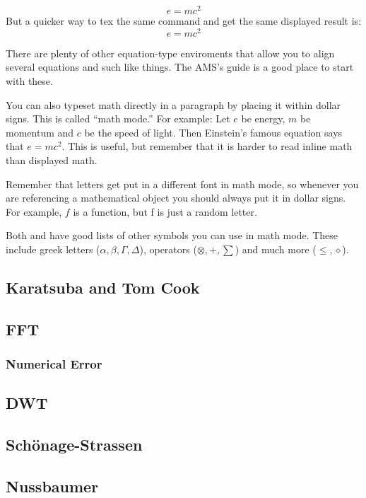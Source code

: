 \documentclass[psamsfonts]{amsart}
\theoremstyle{definition}
\theoremstyle{remark}
\numberwithin{equation}{section}
\begin{document}
\begin{equation*}
e=mc^2
\end{equation*}
But a quicker way to tex the same command and get the same displayed result is:
\[  e=mc^2 \]

There are plenty of other equation-type enviroments that allow you to
align several equations and such like things. The AMS's guide \cite{amsshort} is a
good place to start with these.

You can also typeset math directly in a paragraph by placing it within
dollar signs.  This is called ``math mode.''  For example: Let $e$
be energy, $m$ be momentum and $c$ be the speed of light.  Then
Einstein's famous equation says that $e=mc^2$.  This is useful, but
remember that it is harder to read inline math than displayed math. 

Remember that letters get put in a different font in math mode, so
whenever you are referencing a mathematical object you should always
put it in dollar signs.  For example, $f$ is a function, but f is just
a random letter.

Both \cite{notsoshort} and \cite{amsshort} have good lists of other symbols you can use in math mode.
These include greek letters ($\alpha, \beta, \Gamma, \Delta$),
operators ($\otimes, +, \sum$) and much more ($\leq, \diamond$).

\subsection{Karatsuba and Tom Cook}

\subsection{FFT}

\subsubsection{Numerical Error}

\subsection{DWT}

\subsection{Sch\"onage-Strassen}

\subsection{Nussbaumer}
\end{document}
